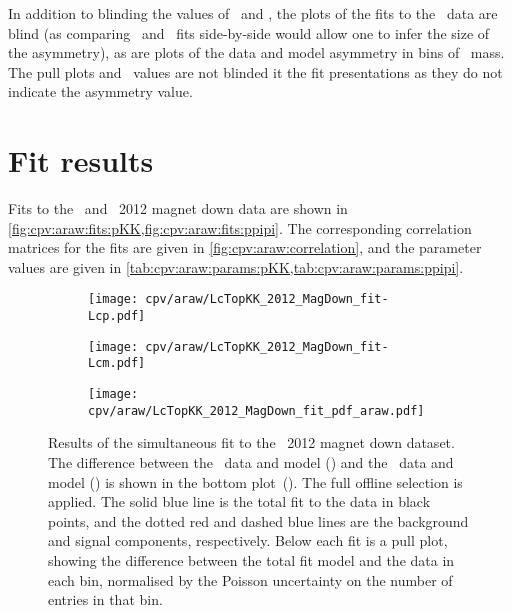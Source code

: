 In addition to blinding the values of \ARaw\ and \dACP, the plots of the fits 
to the \APLambdac\ data are blind (as comparing \PLambdac\ and \APLambdac\ fits 
side-by-side would allow one to infer the size of the asymmetry), as are plots 
of the data and model asymmetry in bins of \PLambdac\ mass.
The pull plots and \chisq\ values are not blinded it the fit presentations as 
they do not indicate the asymmetry value.

\section{Fit results}
\label{chap:cpv:araw:results}

Fits to the \pKK\ and \ppipi\ 2012 magnet down data are shown in 
\cref{fig:cpv:araw:fits:pKK,fig:cpv:araw:fits:ppipi}.
The corresponding correlation matrices for the fits are given in 
\cref{fig:cpv:araw:correlation}, and the parameter values are given in 
\cref{tab:cpv:araw:params:pKK,tab:cpv:araw:params:ppipi}.

\begin{figure}
  \begin{subfigure}[b]{0.5\textwidth}
    \texttt{[image: cpv/araw/LcTopKK\_2012\_MagDown\_fit-Lcp.pdf]}
    \caption{\PLambdac}
    \label{fig:cpv:araw:fits:pKK:Lcp}
  \end{subfigure}
  \begin{subfigure}[b]{0.5\textwidth}
    \texttt{[image: cpv/araw/LcTopKK\_2012\_MagDown\_fit-Lcm.pdf]}
    \caption{\APLambdac}
    \label{fig:cpv:araw:fits:pKK:Lcm}
  \end{subfigure}
  \begin{subfigure}[b]{0.5\textwidth}
    \texttt{[image: cpv/araw/LcTopKK\_2012\_MagDown\_fit\_pdf\_araw.pdf]}
    \caption{\ARaw}
    \label{fig:cpv:araw:fits:pKK:ARaw}
  \end{subfigure}
  \caption{%
    Results of the simultaneous fit to the \pKK\ 2012 magnet down dataset.
    The difference between the \PLambdac\ data and model 
    () and the \APLambdac\ data and model 
    () is shown in the bottom 
    plot~().
    The full offline selection is applied.
    The solid blue line is the total fit to the data in black points, and the 
    dotted red and dashed blue lines are the background and signal components, 
    respectively.
    Below each fit is a pull plot, showing the difference between the total fit 
    model and the data in each bin, normalised by the Poisson uncertainty on 
    the number of entries in that bin.
  }
  \label{fig:cpv:araw:fits:pKK}
\end{figure}

